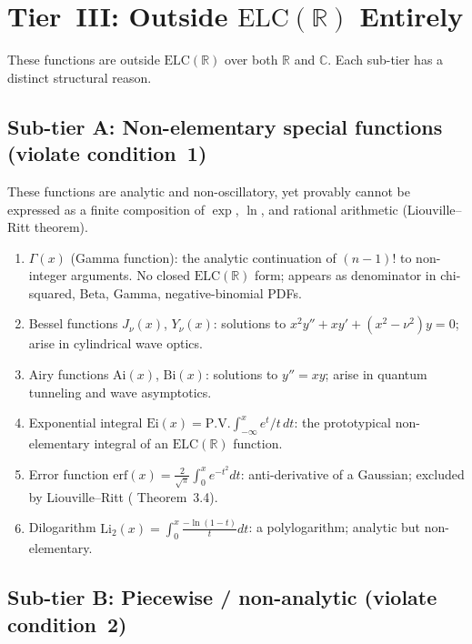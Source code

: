 \documentclass[12pt,a4paper]{article}
\theoremstyle{definition}
\newcommand{\ELC}{\mathrm{ELC}(\mathbb{R})}
\newcommand{\R}{\mathbb{R}}
\newcommand{\C}{\mathbb{C}}
\begin{document}
\section{Tier~III: Outside \texorpdfstring{$\ELC$}{ELC(R)} Entirely}
\label{sec:outside}

These functions are outside $\ELC$ over both $\R$ and $\C$.
Each sub-tier has a distinct structural reason.

\subsection{Sub-tier A: Non-elementary special functions (violate condition~1)}

These functions are analytic and non-oscillatory, yet provably cannot be
expressed as a finite composition of $\exp$, $\ln$, and rational arithmetic
(Liouville--Ritt theorem).

\begin{enumerate}[label=\textbf{A\arabic*.}, leftmargin=*, itemsep=6pt]
\item $\Gamma(x)$ (Gamma function):
  the analytic continuation of $(n-1)!$ to non-integer arguments.
  No closed $\ELC$ form; appears as denominator in chi-squared, Beta, Gamma,
  negative-binomial PDFs.
\item Bessel functions $J_\nu(x)$, $Y_\nu(x)$:
  solutions to $x^2 y''+xy'+(x^2-\nu^2)y=0$; arise in cylindrical wave optics.
\item Airy functions $\mathrm{Ai}(x)$, $\mathrm{Bi}(x)$:
  solutions to $y''=xy$; arise in quantum tunneling and wave asymptotics.
\item Exponential integral $\mathrm{Ei}(x)=\mathrm{P.V.}\int_{-\infty}^x e^t/t\,dt$:
  the prototypical non-elementary integral of an $\ELC$ function.
\item Error function $\mathrm{erf}(x)=\frac{2}{\sqrt{\pi}}\int_0^x e^{-t^2}dt$:
  anti-derivative of a Gaussian; excluded by Liouville--Ritt (\cite{F16}
  Theorem~3.4).
\item Dilogarithm $\mathrm{Li}_2(x)=\int_0^x \frac{-\ln(1-t)}{t}dt$:
  a polylogarithm; analytic but non-elementary.
\end{enumerate}

\subsection{Sub-tier B: Piecewise / non-analytic (violate condition~2)}
\end{document}
